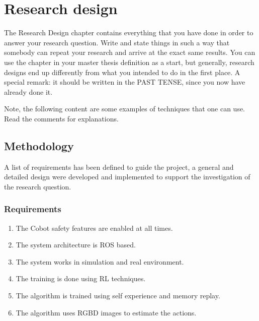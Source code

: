 \chapter{Research design}\label{chap:research}

The Research Design chapter contains everything that you have done in order to answer your research question. Write and state things in such a way that somebody can repeat your research and arrive at the exact same results. You can use the chapter in your master thesis definition as a start, but generally, research designs end up differently from what you intended to do in the first place. A special remark: it should be written in the PAST TENSE, since you now have already done it.


Note, the following content are some examples of techniques that one can use. Read the comments for explanations.


\section{Methodology}

A list of requirements has been defined to guide the project, a general and detailed design were developed and implemented to support the investigation of the research question.

\subsection{Requirements}

\vspace{2mm}
\begin{enumerate}
  \item The Cobot safety features are enabled at all times.
  \item The system architecture is ROS based.
  \item The system works in simulation and real environment.
  \item The training is done using RL techniques.
  \item The algorithm is trained using self experience and memory replay.
  \item The algorithm uses RGBD images to estimate the actions.
\end{enumerate}
\vspace{3mm} 

